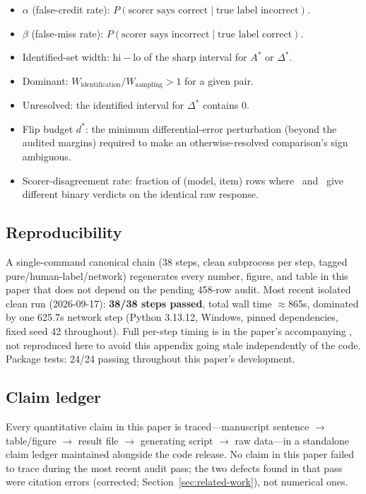\begin{itemize}
  \item $\alpha$ (false-credit rate): $P(\text{scorer says correct} \mid \text{true label incorrect})$.
  \item $\beta$ (false-miss rate): $P(\text{scorer says incorrect} \mid \text{true label correct})$.
  \item Identified-set width: $\mathrm{hi}-\mathrm{lo}$ of the sharp interval for $A^\ast$ or $\Delta^\ast$.
  \item Dominant: $W_{\text{identification}} / W_{\text{sampling}} > 1$ for a given pair.
  \item Unresolved: the identified interval for $\Delta^\ast$ contains 0.
  \item Flip budget $d^\ast$: the minimum differential-error perturbation
  (beyond the audited margins) required to make an otherwise-resolved
  comparison's sign ambiguous.
  \item Scorer-disagreement rate: fraction of (model, item) rows where
  \scoreboxed\ and \exactmatch\ give different binary verdicts on the
  identical raw response.
\end{itemize}

\subsection{Reproducibility}
\label{sec:appendix-repro}

A single-command canonical chain (38 steps, clean subprocess per step,
tagged pure/human-label/network) regenerates every number, figure, and
table in this paper that does not depend on the pending 458-row audit. Most
recent isolated clean run (2026-09-17): \textbf{38/38 steps passed}, total
wall time $\approx$865s, dominated by one 625.7s network step (Python
3.13.12, Windows, pinned dependencies, fixed seed 42 throughout). Full
per-step timing is in the paper's accompanying
, not
reproduced here to avoid this appendix going stale independently of the
code. Package tests: 24/24 passing throughout this paper's development.

\subsection{Claim ledger}
\label{sec:appendix-claim-ledger}

Every quantitative claim in this paper is traced---manuscript sentence
$\to$ table/figure $\to$ result file $\to$ generating script $\to$ raw
data---in a standalone claim ledger maintained alongside the code release.
No claim in this paper failed to trace during the most recent audit pass;
the two defects found in that pass were citation errors (corrected;
Section~\ref{sec:related-work}), not numerical ones.

